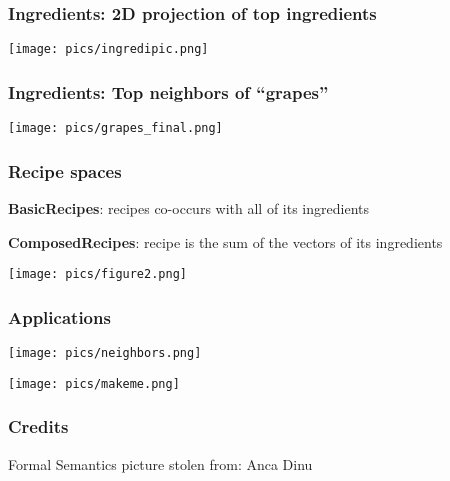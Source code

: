 \documentclass{beamer}
\begin{document}
\begin{frame}
    \frametitle{\textbf{Ingredients}: 2D projection of top ingredients}

    \centering\texttt{[image: pics/ingredipic.png]}
\end{frame}

\begin{frame}
    \frametitle{\textbf{Ingredients}: Top neighbors of ``grapes''}
    \texttt{[image: pics/grapes\_final.png]}
\end{frame}

\begin{frame}
    \frametitle{Recipe spaces}

    \textbf{BasicRecipes}: recipes co-occurs with all of its ingredients

    \vspace{0.2cm}

    \textbf{ComposedRecipes}: recipe is the sum of the vectors of its ingredients

    \vspace{0.2cm}

    \begin{center}
        \texttt{[image: pics/figure2.png]}
    \end{center}
\end{frame}

\begin{frame}
    \frametitle{Applications}

    \texttt{[image: pics/neighbors.png]}

    \texttt{[image: pics/makeme.png]}

\end{frame}

\begin{frame}
    \frametitle{Credits}


    \vspace{2cm}

    \footnotesize{Formal Semantics picture stolen from: Anca Dinu}
\end{frame}
\end{document}
